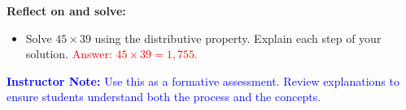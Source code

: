 \documentclass[12pt]{article}
\begin{document}
\vspace{1em}

\begin{tcolorbox}[colframe=black!60, colback=white, 
coltitle=black, colbacktitle=black!15, fonttitle=\bfseries\Large, 
title=Exit Ticket, halign title=center, left=10pt, right=10pt, top=10pt, bottom=15pt]
\textbf{Reflect on and solve:}
\begin{itemize}
    \item Solve \( 45 \times 39 \) using the distributive property. Explain each step of your solution. \textcolor{red}{Answer: \( 45 \times 39 = 1,755 \).}
\end{itemize}

\textcolor{blue}{\textbf{Instructor Note:} Use this as a formative assessment. Review explanations to ensure students understand both the process and the concepts.}
\end{tcolorbox}
\end{document}
